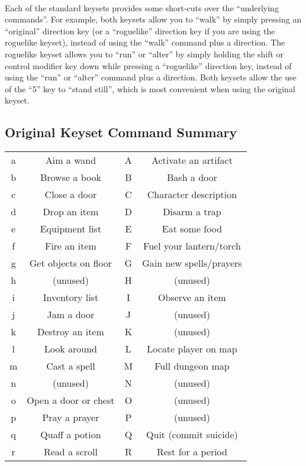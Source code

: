 \paragraph{}Each of the standard keysets provides some short-cuts over the ``underlying
commands''. For example, both keysets allow you to ``walk'' by simply pressing
an ``original'' direction key (or a ``roguelike'' direction key if you are using
the roguelike keyset), instead of using the ``walk'' command plus a direction.
The roguelike keyset allows you to ``run'' or ``alter'' by simply holding the
shift or control modifier key down while pressing a ``roguelike'' direction key,
instead of using the ``run'' or ``alter'' command plus a direction. Both keysets
allow the use of the ``5'' key to ``stand still'', which is most convenient when
using the original keyset.

\subsection{Original Keyset Command Summary}
\begin{tabular}{cc|cc}
a & Aim a wand & A & Activate an artifact\\
b & Browse a book & B & Bash a door\\
c & Close a door & C & Character description\\
d & Drop an item & D & Disarm a trap\\
e & Equipment list & E & Eat some food\\
f & Fire an item & F & Fuel your lantern/torch\\
g & Get objects on floor & G & Gain new spells/prayers\\
h & (unused) & H & (unused)\\
i & Inventory list & I & Observe an item\\
j & Jam a door & J & (unused)\\
k & Destroy an item & K & (unused)\\
l & Look around & L & Locate player on map\\
m & Cast a spell & M & Full dungeon map\\
n & (unused) & N & (unused)\\
o & Open a door or chest & O & (unused)\\
p & Pray a prayer & P & (unused)\\
q & Quaff a potion & Q & Quit (commit suicide)\\
r & Read a scroll & R & Rest for a period\\
\end{tabular}
